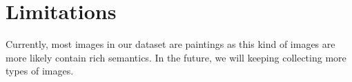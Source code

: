 \section{Limitations}

Currently, most images in our dataset are paintings as this kind of images are more likely contain rich semantics. 
In the future, we will keeping collecting more types of images.
